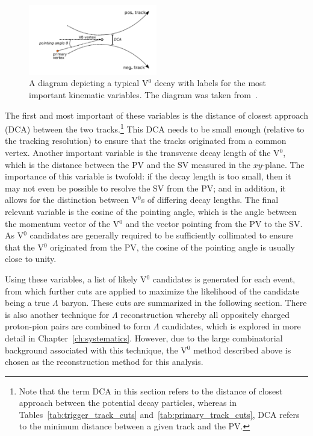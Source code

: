 \begin{figure}[h]
	\centering
	\includegraphics[width=0.5\textwidth]{figures/analysis/v0_decay.png}
	\caption{A diagram depicting a typical V$^0$ decay with labels for the most important kinematic variables. The diagram was taken from~\cite{V0Decay}.}
	\label{fig:v0_decay}
\end{figure}

The first and most important of these variables is the distance of closest approach (DCA) between the two tracks.\footnote{Note that the term DCA in this section refers to the distance of closest approach between the potential \lmb decay particles, whereas in Tables~\ref{tab:trigger_track_cuts} and~\ref{tab:primary_track_cuts}, DCA refers to the minimum distance between a given track and the PV.} This DCA needs to be small enough (relative to the tracking resolution) to ensure that the tracks originated from a common vertex. Another important variable is the transverse decay length of the V$^0$, which is the distance between the PV and the SV measured in the $xy$-plane. The importance of this variable is twofold: if the decay length is too small, then it may not even be possible to resolve the SV from the PV; and in addition, it allows for the distinction between V$^0$s of differing decay lengths. The final relevant variable is the cosine of the pointing angle, which is the angle between the momentum vector of the V$^0$ and the vector pointing from the PV to the SV. As V$^0$ candidates are generally required to be sufficiently collimated to ensure that the V$^0$ originated from the PV, the cosine of the pointing angle is usually close to unity.

Using these variables, a list of likely V$^0$ candidates is generated for each event, from which further cuts are applied to maximize the likelihood of the candidate being a true $\Lambda$ baryon. These cuts are summarized in the following section. There is also another technique for $\Lambda$ reconstruction whereby all oppositely charged proton-pion pairs are combined to form $\Lambda$ candidates, which is explored in more detail in Chapter~\ref{ch:systematics}. However, due to the large combinatorial background associated with this technique, the V$^0$ method described above is chosen as the \lmb reconstruction method for this analysis.


